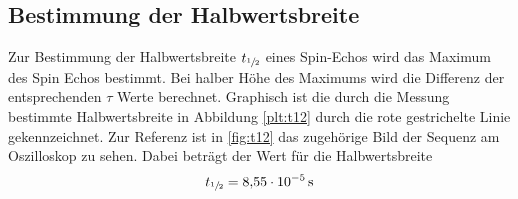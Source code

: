 \subsection{Bestimmung der Halbwertsbreite}
Zur Bestimmung der Halbwertsbreite $t_{\sfrac{1}{2}}$ eines Spin-Echos wird das
Maximum des Spin Echos bestimmt. Bei halber Höhe des Maximums wird die Differenz
der entsprechenden $\tau$ Werte berechnet. Graphisch ist die durch die Messung
bestimmte Halbwertsbreite in Abbildung \ref{plt:t12} durch die rote gestrichelte
Linie gekennzeichnet.
Zur Referenz ist in \ref{fig:t12} das zugehörige Bild der Sequenz am Oszilloskop zu sehen.
Dabei beträgt der Wert für die Halbwertsbreite
\begin{align*}
  t_{\sfrac{1}{2}} = \SI{8.55e-5}{\second}
\end{align*}
\FloatBarrier

